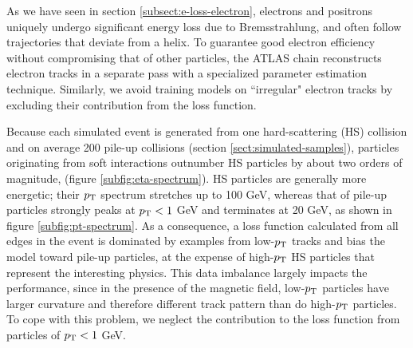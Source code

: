 As we have seen in section \ref{subsect:e-loss-electron}, electrons and positrons uniquely undergo significant energy loss due to Bremsstrahlung, and often follow trajectories that deviate from a helix. 
To guarantee good electron efficiency without compromising that of other particles, the ATLAS chain reconstructs electron tracks in a separate pass with a specialized parameter estimation technique. 
Similarly, we avoid training models on ``irregular" electron tracks by excluding their contribution from the loss function.

Because each simulated event is generated from one hard-scattering (HS) collision and on average 200 pile-up collisions (section \ref{sect:simulated-samples}), particles originating from soft interactions outnumber HS particles by about two orders of magnitude, (figure \ref{subfig:eta-spectrum}). 
HS particles are generally more energetic; their $p_{\text{T}}$ spectrum stretches up to 100 GeV, whereas that of pile-up particles strongly peaks at $p_{\text{T}}<1$ GeV and terminates at 20 GeV, as shown in figure \ref{subfig:pt-spectrum}. 
As a consequence, a loss function calculated from all edges in the event is dominated by examples from low-$p_{\text{T}}$ tracks and bias the model toward pile-up particles, at the expense of high-$p_{\text{T}}$ HS particles that represent the interesting physics.
This data imbalance largely impacts the performance, since in the presence of the magnetic field, low-$p_{\text{T}}$ particles have larger curvature and therefore different track pattern than do high-$p_{\text{T}}$ particles.
To cope with this problem, we neglect the contribution to the loss function from particles of $p_{\text{T}}<1$ GeV.

